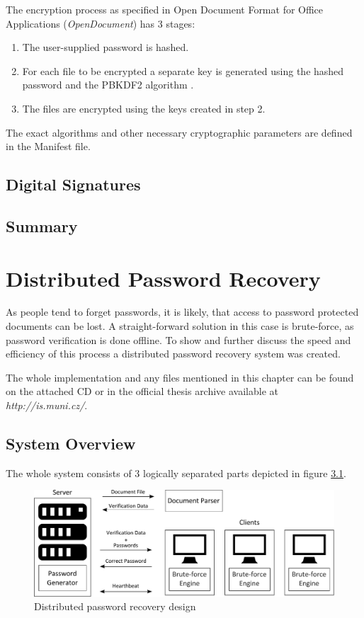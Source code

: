 \documentclass[11pt,oneside]{fithesis2}
\begin{document}
The encryption process as specified in Open Document Format for Office Applications (\textit{OpenDocument}) \cite{odt_spec} has 3 stages:

\begin{enumerate}
\setlength\itemsep{0.1em}
	\item{The user-supplied password is hashed.}
	\item{For each file to be encrypted a separate key is generated using the hashed password and the PBKDF2 algorithm \cite{rfc2898}.}
	\item{The files are encrypted using the keys created in step 2.}
\end{enumerate}

The exact algorithms and other necessary cryptographic parameters are defined in the Manifest file.


\section{Digital Signatures}

\section{Summary}

\chapter{Distributed Password Recovery}

As people tend to forget passwords, it is likely, that access to password protected documents can be lost. A straight-forward solution in this case is brute-force, as password verification is done offline. To show and further discuss the speed and efficiency of this process a distributed password recovery system was created.

The whole implementation and any files mentioned in this chapter can be found on the attached CD or in the official thesis archive available at \textit{http://is.muni.cz/}.

\section{System Overview}

The whole system consists of 3 logically separated parts depicted in figure \ref{ddpbf_design}. 

\begin{figure}[ht]
	\centering
	\includegraphics[width=1\textwidth]{figures/ddpbf_design.pdf}
	\caption{Distributed password recovery design}
	\label{ddpbf_design}
\end{figure}
\end{document}
